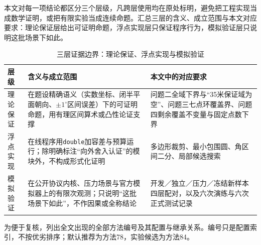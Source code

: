\documentclass[UTF8,a4paper,zihao=-4,fontset=fandol]{ctexart}
\begin{document}
本文对每一项结论都区分三个层级，凡跨层使用均在原处标明，避免把工程实现当成数学证明，或把有限实验当成连续命题。汇总三层的含义、成立范围与本文对应要求：理论保证层给出可证明命题，浮点实现层只保证程序行为，模拟验证层只说明这批场景下如此。
\begin{table}[!htbp]\centering\small\caption{三层证据边界：理论保证、浮点实现与模拟验证}\label{tab:boundary}
\begin{tabular}{p{2.25cm}p{4.72cm}p{6.0cm}}\toprule 层级&含义与成立范围&本文中的对应要求\\\midrule
理论保证&在题设精确语义（实数坐标、闭半平面朝向、$\pm1^\circ$区间误差）下的可证明命题，用有理区间算术或凸性论证支撑&问题二全域下界与“35米保证域为空”、问题三七点环覆盖界、问题四剩余覆盖不变量与固定点数下界\\\addlinespace
浮点实现&在线程序用\texttt{double}加容差与预算运行；除明确标注“向外舍入认证”的模块外，不构成形式化证明&多边形裁剪、最小包围圆、角区间二分、局部候选搜索\\\addlinespace
模拟验证&在公开协议内核、压力场景与官方模拟器上的有限次观测；只说明“这批场景下如此”，不作因果或全称结论&开发／独立／压力／冻结新样本四层配对，以及六次演练与六次正式测试记录\\\bottomrule\end{tabular}\end{table}

为便于复核，列出全文出现的全部方法编号及其配置与继承关系。编号只是配置索引，不按优劣排序；默认推荐为方法78，实验候选为方法84。
\end{document}
